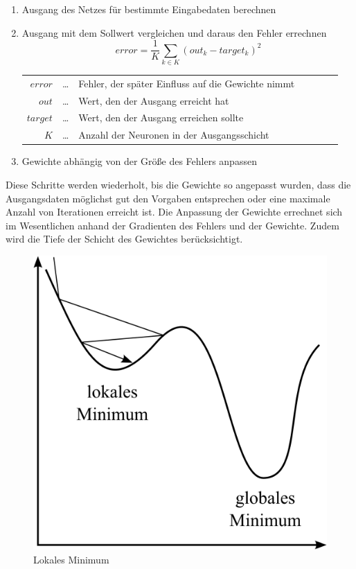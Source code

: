 \begin{enumerate}
\item Ausgang des Netzes für bestimmte Eingabedaten berechnen
\item Ausgang mit dem Sollwert vergleichen und daraus den Fehler errechnen
	$$error = \frac{1}{K}\sum_{k \in K}(out_k-target_k)^2$$
	\begin{center}\begin{tabular}{rclcrcl}
		$error$ & \dots & Fehler, der später Einfluss auf die Gewichte nimmt\\
		$out$ & \dots & Wert, den der Ausgang erreicht hat\\
		$target$ & \dots & Wert, den der Ausgang erreichen sollte\\ 
		$K$ & \dots & Anzahl der Neuronen in der Ausgangsschicht\\
	\end{tabular}\end{center}
\item Gewichte abhängig von der Größe des Fehlers anpassen
\end{enumerate}

Diese Schritte werden wiederholt, bis die Gewichte so angepasst wurden, dass die Ausgangsdaten möglichst gut den Vorgaben entsprechen oder eine maximale Anzahl von Iterationen erreicht ist. Die Anpassung der Gewichte errechnet sich im Wesentlichen anhand der Gradienten des Fehlers und der Gewichte. Zudem wird die Tiefe der Schicht des Gewichtes berücksichtigt.

\begin{figure}
	\centering
	\includegraphics[scale=1]{images/lokales-minimum.png}
	\caption{Lokales Minimum}
	\label{fig:local-min}
\end{figure}


